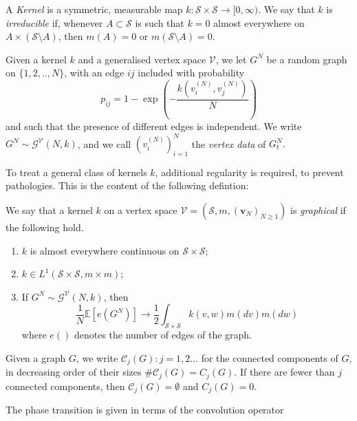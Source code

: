 \begin{definition}
    A \emph{Kernel} is a symmetric, measurable map $k: \mathcal{S}\times \mathcal{S} \rightarrow [0, \infty).$ We say that $k$ is \emph{irreducible} if, whenever $A\subset \mathcal{S}$ is such that $k=0$ almost everywhere on $A\times (\mathcal{S}\setminus A)$, then $m(A)=0$ or $m(\mathcal{S}\setminus A)=0$. 
    \end{definition} \begin{definition}\label{definition of GN} Given a kernel $k$ and a generalised vertex space $\mathcal{V}$, we let
    $G^N$ be a random graph on $\{1, 2,..,N\}$, with an edge $ij$ included with probability \begin{equation}
        p_{ij}=1-\exp\left(-\frac{k(v^{(N)}_i,v^{(N)}_j)}{N} \right)
    \end{equation} and such that the presence of different edges is independent. We write $G^N\sim\mathcal{G}^\mathcal{V}(N,k)$, and we call $(v^{(N)}_i)_{i=1}^N$ the \emph{vertex data} of $G^N_t.$
\end{definition} To treat a general class of kernels $k$, additional regularity is required, to prevent pathologies. This is the content of the following defintion: \begin{definition}
    We say that a kernel $k$ on a vertex space $\mathcal{V}=(\mathcal{S}, m, (\mathbf{v}_N)_{N\geq 1})$ is \emph{graphical} if the following hold. 
    \begin{enumerate}[label=\roman{*}).]
        \item $k$ is almost everywhere continuous on $\mathcal{S}\times\mathcal{S};$
        \item $k \in L^1(\mathcal{S}\times \mathcal{S}, m \times m)$;
        \item If $G^N \sim \mathcal{G}^\mathcal{V}(N,k)$, then
        \begin{equation}
            \frac{1}{N}\mathbb{E}\left[e\left(G^N\right)\right]\rightarrow \frac{1}{2}\int_{\mathcal{S}\times \mathcal{S}} k(v,w)m(dv)m(dw)
        \end{equation} where $e()$ denotes the number of edges of the graph.
    \end{enumerate}
\end{definition}  \begin{definition}
 Given a graph $G$, we write $\mathcal{C}_j(G): j=1, 2...$ for the connected components of $G$, in decreasing order of their sizes $\#\mathcal{C}_j(G)=C_j(G)$. If there are fewer than $j$ connected components, then $\mathcal{C}_j(G)=\emptyset$ and $C_j(G)=0$.
\end{definition}The phase transition is given in terms of the convolution operator
